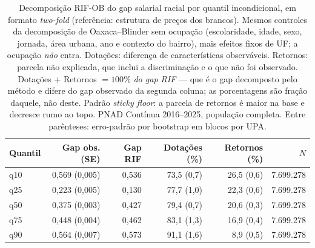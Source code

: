 \begin{table}[!ht]
\centering
\caption{Decomposição RIF-OB \cite{firpo2018} do gap salarial racial
por quantil incondicional, em formato \emph{two-fold} (referência: estrutura de preços
dos brancos). Mesmos controles da decomposição de Oaxaca--Blinder sem ocupação (escolaridade,
idade, sexo, jornada, área urbana, ano e contexto do bairro), mais efeitos fixos de UF; a ocupação \emph{não} entra.
Dotações: diferença de características observáveis. Retornos: parcela não explicada, que
inclui a discriminação e o que não foi observado. Dotações + Retornos
$=100\%$ \emph{do gap RIF} --- que é o gap decomposto pelo
método e difere do gap observado da segunda coluna; as porcentagens
são fração daquele, não deste. Padrão \emph{sticky floor}: a parcela de retornos
é maior na base e decresce rumo ao topo. PNAD Contínua 2016--2025,
população completa. Entre parênteses: erro-padrão por bootstrap em blocos por UPA.}
\label{tab:rif_ob}
\begin{tabular}{lrrrrr}
\toprule
Quantil & Gap obs. (SE) & Gap RIF & Dotações (\%) & Retornos (\%) & $N$ \\
\midrule
q10 & 0,569 (0,005) & 0,536 & 73,5 (0,7) & 26,5 (0,6) & 7.699.278 \\
q25 & 0,223 (0,005) & 0,130 & 77,7 (1,0) & 22,3 (0,6) & 7.699.278 \\
q50 & 0,375 (0,003) & 0,427 & 79,4 (0,7) & 20,6 (0,3) & 7.699.278 \\
q75 & 0,448 (0,004) & 0,462 & 83,1 (1,3) & 16,9 (0,4) & 7.699.278 \\
q90 & 0,564 (0,007) & 0,573 & 91,1 (1,6) & 8,9 (0,5) & 7.699.278 \\
\bottomrule
\end{tabular}
\end{table}
